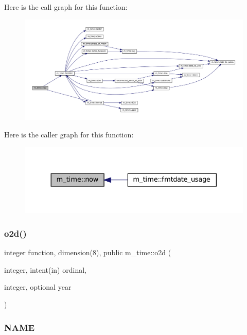 Here is the call graph for this function\+:\nopagebreak
\begin{figure}[H]
\begin{center}
\leavevmode
\includegraphics[width=350pt]{namespacem__time_a6b5e87be0e510ff268c1ecfbf67a3bdb_cgraph}
\end{center}
\end{figure}
Here is the caller graph for this function\+:\nopagebreak
\begin{figure}[H]
\begin{center}
\leavevmode
\includegraphics[width=330pt]{namespacem__time_a6b5e87be0e510ff268c1ecfbf67a3bdb_icgraph}
\end{center}
\end{figure}
\mbox{\label{namespacem__time_a55e2cb9efc9d4d209ae2864f073d4f19}} 
\subsubsection{\texorpdfstring{o2d()}{o2d()}}
{\footnotesize\ttfamily integer function, dimension(8), public m\+\_\+time\+::o2d (\begin{DoxyParamCaption}\item[{integer, intent(in)}]{ordinal,  }\item[{integer, optional}]{year }\end{DoxyParamCaption})}



\subsubsection*{N\+A\+ME}

